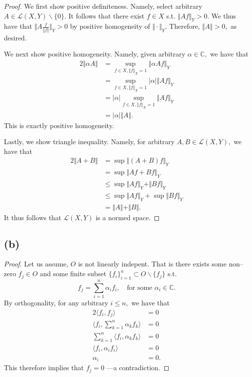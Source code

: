 \documentclass[10pt]{article}
\begin{document}
\begin{proof}
    We first show positive definiteness. Namely, select arbitrary $A\in \mathscr{L}(X,Y) \backslash \{0\}.$ It follows that there exist $f\in X$ s.t. $\Vert Af\Vert_Y >0.$  We thus have that $\Vert A \frac{f}{\Vert f\Vert}\Vert_Y > 0$ by positive homogeneity of $\Vert \cdot\Vert_Y.$ Therefore, $\Vert A\Vert > 0,$ as desired.

    We next show positive homogeneity. Namely, given arbitrary $\alpha\in\mathbb{C},$ we have that
    \begin{alignat*}{2}
        \Vert \alpha A\Vert &= \sup_{f\in X, \Vert f\Vert_X = 1} \Vert \alpha Af\Vert_Y\\
        &= \sup_{f\in X, \Vert f\Vert_X = 1} |\alpha|\Vert  Af\Vert_Y\\
        &= |\alpha| \sup_{f\in X, \Vert f\Vert_X = 1} \Vert  Af\Vert_Y\\
        &= |\alpha| \Vert A\Vert.
    \end{alignat*}
    This is exactly positive homogeneity.

    Lastly, we show triangle inequality. Namely, for arbitrary $A,B\in\mathscr{L}(X,Y),$ we have that
    \begin{alignat*}{2}
        \Vert A+B\Vert &= \sup \Vert (A+B)f\Vert_Y\\
        &= \sup \Vert Af + Bf\Vert_Y\\
        &\le \sup \Vert Af\Vert_Y + \Vert Bf\Vert_Y\\
        &\le \sup \Vert Af\Vert_Y + \sup\Vert Bf\Vert_Y\\
        &= \Vert A\Vert + \Vert B\Vert.
    \end{alignat*}
    It thus follows that $\mathscr{L}(X,Y)$ is a normed space.
\end{proof}

\subsection*{(b)}

\begin{proof}
    Let us assume, $O$ is not linearly indepent. That is there exists some non--zero $f_j\in O$ and some finite subset $\{f_i\}_{i=1}^n\subset O\backslash \{f_j\}$ s.t.
    \[f_j = \sum_{i=1}^n \alpha_i f_i, \quad\text{for some }\alpha_i\in\mathbb{C}.\]
    By orthogonality, for any arbitrary $i\le n,$ we have that
    \begin{alignat*}{2}
        \langle f_i, f_j\rangle &= 0\\
        \langle f_i, \sum_{k=1}^{n}\alpha_kf_k\rangle &= 0\\
        \sum_{k=1}^{n} \langle f_i, \alpha_k f_k\rangle &= 0\\
        \langle f_i, \alpha_i f_i \rangle &= 0\\
        \alpha_i &= 0.
    \end{alignat*}
    This therefore implies that $f_j = 0$ ---a contradiction.
\end{proof}
\end{document}
